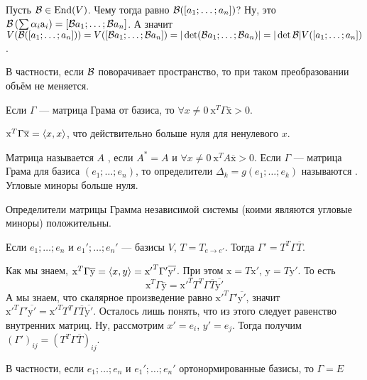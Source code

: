 \documentclass{article}
\begin{document}
\begin{itemize}
        \thm Пусть ${\mathcal{B}}\in\operatorname{End}(V)$. Чему тогда равно ${\mathcal{B}}([a_1;\ldots;a_n])$? Ну, это ${\mathcal{B}}\left(\sum\alpha_i\mathrm a_i\right)=[{\mathcal{B}} a_1;\ldots;{\mathcal{B}} a_n]$. А значит $V({\mathcal{B}}([a_1;\ldots;a_n]))=V([{\mathcal{B}} a_1;\ldots;{\mathcal{B}} a_n])=|\det({\mathcal{B}} a_1;\ldots;{\mathcal{B}} a_n)|=|\det{\mathcal{B}}|V([a_1;\ldots;a_n])$.
        \begin{Comment}
            В частности, если ${\mathcal{B}}$ поворачивает пространство, то при таком преобразовании объём не меняется.
        \end{Comment}
        \thm Если $\Gamma$ --- матрица Грама от базиса, то $\forall x\neq0~\mathrm x^T\Gamma\overline{\mathrm x}>0$.
        \begin{Proof}
            $\mathrm x^T\Gamma\overline{\mathrm x}={\left\langle{x},{x}\right\rangle}$, что действительно больше нуля для ненулевого $x$.
        \end{Proof}
        \dfn Матрица называется $A$ , если $A^*=A$ и $\forall x\neq0~\mathrm x^TA\overline{\mathrm x}>0$.
        \dfn Если $\Gamma$ --- матрица Грама для базиса $(e_1;\ldots;e_n)$, то определители $\Delta_k=g(e_1;\ldots;e_k)$ называются .
        \thm Угловые миноры больше нуля.
        \begin{Proof}
            Определители матрицы Грамма независимой системы (коими являются угловые миноры) положительны.
        \end{Proof}
        \thm Если $e_1;\ldots;e_n$ и $e_1';\ldots;e_n'$ --- базисы $V$, $T=T_{e\to e'}$. Тогда $\Gamma'=T^T\Gamma\overline T$.
        \begin{Proof}
            Как мы знаем, $\mathrm x^T\Gamma\overline{\mathrm y}={\left\langle{x},{y}\right\rangle}={{\mathrm x}'}^T\Gamma'\overline{\mathrm y'}$. При этом $\mathrm x=T\mathrm x'$, $\mathrm y=T\mathrm y'$. То есть
            $$
            \mathrm x^T\Gamma\overline{\mathrm y}={\mathrm x'}^TT^T\Gamma\overline T\overline{\mathrm y'}
            $$
            А мы знаем, что скалярное произведение равно ${\mathrm x'}^T\Gamma'\overline{\mathrm y'}$, значит ${\mathrm x'}^T\Gamma'\overline{\mathrm y'}={\mathrm x'}^TT^T\Gamma\overline T\overline{\mathrm y'}$. Осталось лишь понять, что из этого следует равенство внутренних матриц. Ну, рассмотрим $x'=e_i$, $y'=e_j$. Тогда получим $(\Gamma')_{ij}=(T^T\Gamma\overline T)_{ij}$.
        \end{Proof}
        \begin{Comment}
            В частности, если $e_1;\ldots;e_n$ и $e_1';\ldots;e_n'$ ортонормированные базисы, то $\Gamma=E$

\end{Comment}
\end{itemize}
\end{document}
